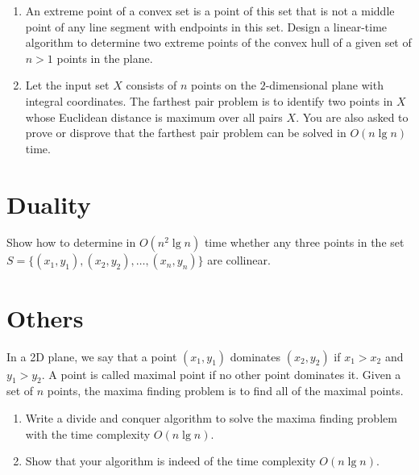 \begin{refsection}
\begin{Exercise}
\begin{enumerate}
\item An extreme point of a convex set is a point of this set that is not a middle point of any line segment with endpoints in this set. Design a linear-time algorithm to determine two extreme points of the convex hull of a given set of $n > 1$ points in the plane. 
\item Let the input set $X$ consists of $n$ points on the $2$-dimensional plane with integral coordinates. The farthest pair problem is to identify two points in $X$ whose Euclidean distance is maximum over all pairs $X$. You are also asked to prove or disprove that the farthest pair problem can be solved in $O(n \lg n)$ time. 
\end{enumerate}
\end{Exercise}
\begin{Answer}
\end{Answer}

\section{Duality}
\begin{Exercise}
Show how to determine in $O(n^2 \lg n)$ time whether any three points in the set $S = \{(x_1, y_1), (x_2, y_2), \dots, (x_n, y_n)\}$ are collinear. 
\end{Exercise}
\begin{Answer}
\end{Answer}

\section{Others}

\begin{Exercise}
In a 2D plane, we say that a point $(x_1, y_1)$ dominates $(x_2, y_2)$ if $x_1 > x_2$ and $y_1 > y_2$. A point is called maximal point if no other point dominates it. Given a set of $n$ points, the maxima finding problem is to find all of the maximal points.
\begin{enumerate}
\item Write a divide and conquer algorithm to solve the maxima finding problem with the time complexity $O(n \lg n)$.
\item Show that your algorithm is indeed of the time complexity $O(n \lg n)$. 
\end{enumerate}
\end{Exercise}
\begin{Answer}
\end{Answer}



\printbibliography[heading=subbibliography]
\end{refsection}
